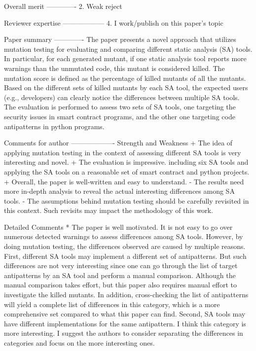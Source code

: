 Overall merit
-------------
2. Weak reject

Reviewer expertise
------------------
4. I work/publish on this paper's topic

Paper summary
-------------
The paper presents a novel approach that utilizes mutation testing for evaluating and comparing different static analysis (SA) tools. In particular, for each generated mutant, if one static analysis tool reports more warnings than the unmutated code, this mutant is considered killed. The mutation score is defined as the percentage of killed mutants of all the mutants. Based on the different sets of killed mutants by each SA tool, the expected users (e.g., developers) can clearly notice the differences between multiple SA tools. The evaluation is performed to assess two sets of SA tools, one targeting the security issues in smart contract programs, and the other one targeting code antipatterns in python programs.

Comments for author
-------------------
Strength and Weakness
+ The idea of applying mutation testing in the context of assessing different SA tools is very interesting and novel.
+ The evaluation is impressive. including six SA tools and applying the SA tools on a reasonable set of smart contract and python projects.
+ Overall, the paper is well-written and easy to understand. 
- The results need more in-depth analysis to reveal the actual interesting differences among SA tools.
- The assumptions behind mutation testing should be carefully revisited in this context. Such revisits may impact the methodology of this work.

Detailed Comments
* The paper is well motivated. It is not easy to go over numerous detected warnings to assess differences among SA tools. However, by doing mutation testing, the differences observed are caused by multiple reasons. First, different SA tools may implement a different set of antipatterns. But such differences are not very interesting since one can go through the list of target antipatterns by an SA tool and perform a manual comparison. Although the manual comparison takes effort, but this paper also requires manual effort to investigate the killed mutants. In addition, cross-checking the list of antipatterns will yield a complete list of differences in this category, which is a more comprehensive set compared to what this paper can find. Second, SA tools may have different implementations for the same antipattern. I think this category is more interesting. I suggest the authors to consider separating the differences in categories and focus on the more interesting ones.

